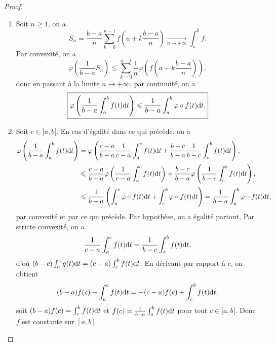 \begin{proof}
    \phantom{}
    \begin{enumerate}
        \item Soit $n\geqslant1$, on a 
        \begin{equation}
            S_n=\frac{b-a}{n}\sum_{k=0}^{n-1}f\left(a+k\frac{b-a}{n}\right)\xrightarrow[n\to+\infty]{}\int_{a}^{b}f.
        \end{equation}
        Par convexité, on a 
        \begin{equation}
            \varphi\left(\frac{1}{b-a}S_n\right)\leqslant\sum_{k=0}^{n-1}\frac{1}{n}\varphi\left(f\left(a+k\frac{b-a}{n}\right)\right),
        \end{equation}
        donc en passant à la limite $n\to+\infty$, par continuité, on a 
        \begin{equation}
            \boxed{
            \varphi\left(\frac{1}{b-a}\int_{a}^{b}f(t)\mathrm{d} t\right)\leqslant\frac{1}{b-a}\int_{a}^{b}\varphi\circ f(t)\mathrm{d} t.}
        \end{equation}

        \item Soit $c\in]a,b[$. En cas d'égalité dans ce qui précède, on a 
        \begin{align}
            \varphi\left(\frac{1}{b-a}\int_{a}^{b}f(t)\mathrm{d} t\right)
            &=\varphi\left(\frac{c-a}{b-a}\frac{1}{c-a}\int_{a}^{c}f(t)\mathrm{d} t+\frac{b-c}{b-a}\frac{1}{b-c}\int_{c}^{b}f(t)\mathrm{d} t\right),\\
            &\leqslant\frac{c-a}{b-a}\varphi\left(\frac{1}{c-a}\int_{a}^{c}f(t)\mathrm{d} t\right)+\frac{b-c}{b-a}\varphi\left(\frac{1}{b-c}\int_{c}^{b}f(t)\mathrm{d} t\right),\\
            &\leqslant\frac{1}{b-a}\left(\int_{a}^{c}\varphi\circ f(t)\mathrm{d} t+\int_{c}^{b}\varphi\circ f(t)\mathrm{d} t\right)=\frac{1}{b-a}\int_{a}^{b}\varphi\circ f(t)\mathrm{d} t,
        \end{align}
        par convexité et par ce qui précède. Par hypothèse, on a égalité partout, Par stricte convexité, on a 
        \begin{equation}
            \frac{1}{c-a}\int_{a}^{c}f(t)\mathrm{d} t=\frac{1}{b-c}\int_{c}^{b}f(t)\mathrm{d} t,
        \end{equation}
        d'où $(b-c)\int_{a}^{c}g(t)\mathrm{d} t=(c-a)\int_{c}^{b}f(t)\mathrm{d} t$. En dérivant par rapport à $c$, on obtient
        \begin{equation}
            (b-a)f(c)-\int_{a}^{c}f(t)\mathrm{d} t=-(c-a)f(c)+\int_{c}^{b}f(t)\mathrm{d} t,
        \end{equation}
        soit $(b-a)f(c)=\int_{c}^{b}f(t)\mathrm{d} t$ et $f(c)=\frac{1}{b-a}\int_{a}^{b}f(t)\mathrm{d} t$ pour tout $c\in]a,b[$. Donc $f$ est constante sur $[a,b]$.
    \end{enumerate}
\end{proof}

